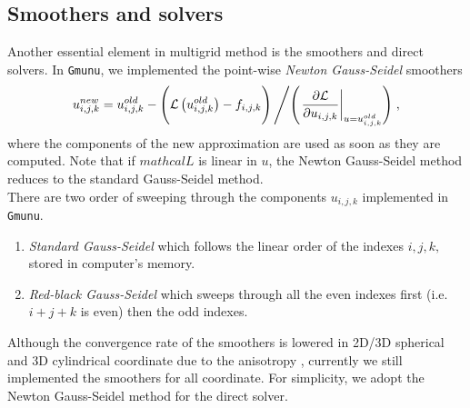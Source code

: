\subsection{Smoothers and solvers} %
\label{section3.1.3}
Another essential element in multigrid method is the smoothers and direct solvers.
In \texttt{Gmunu}, we implemented the point-wise \textit{Newton Gauss-Seidel} smoothers \cite{press1996numerical}
\begin{align}
    u^{new}_{i,j,k} = u^{old}_{i,j,k} - \Bigg(\mathcal{L}\left(u^{old}_{i,j,k}\right) - f_{i,j,k} \Bigg)
    \left/ \left( \left. \frac{\partial \mathcal{L}}{\partial u_{i,j,k}}\right|_{u=u^{old}_{i,j,k}}\right)\right. ,
\end{align}
where the components of the new approximation are used as soon as they are computed.
Note that if $mathcal{L}$ is linear in $u$,
the Newton Gauss-Seidel method reduces to the standard Gauss-Seidel method.\\
There are two order of sweeping through the components $u_{i,j,k}$ implemented in \texttt{Gmunu}.
\begin{enumerate}
    \item \textit{Standard Gauss-Seidel} which follows the linear order of the indexes $i,j,k,$ stored in computer's memory.
    \item \textit{Red-black Gauss-Seidel} which sweeps through all the even indexes first (i.e. $i+j+k$ is even) then the odd indexes.
\end{enumerate}

Although the convergence rate of the smoothers is lowered in 2D/3D spherical and 3D cylindrical coordinate due to the anisotropy \cite{trottenberg2000multigrid},
currently we still implemented the smoothers for all coordinate.
For simplicity,
we adopt the Newton Gauss-Seidel method for the direct solver.

